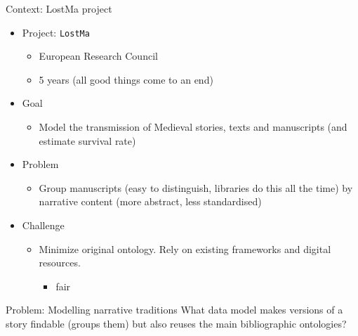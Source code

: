 \documentclass[xcolor=table]{beamer}
\begin{document}
\begin{frame}{Context: LostMa project}
\vspace{1em}
\begin{itemize}
    \item Project: \texttt{LostMa}
    \begin{itemize}
        \item European Research Council
        \item 5 years (all good things come to an end)
    \end{itemize}
    \item Goal
        \begin{itemize}
            \item Model the transmission of Medieval stories, texts and manuscripts (and estimate survival rate)
        \end{itemize}
    \item Problem
        \begin{itemize}
            \item Group manuscripts (easy to distinguish, libraries do this all the time) by narrative content (more abstract, less standardised)
        \end{itemize}
    \item Challenge
        \begin{itemize}
            \item Minimize original ontology. Rely on existing frameworks and digital resources.
            \begin{itemize}
                \item \ac{fair}
            \end{itemize}
        \end{itemize}
\end{itemize}
\end{frame}

\begin{frame}{Problem: Modelling narrative traditions}
What data model makes versions of a story findable (groups them) but also reuses the main bibliographic ontologies?

    \begin{adjustbox}{max totalsize={\textwidth}{0.9\textheight},center}
	
	\end{adjustbox}
\end{frame}
\end{document}
